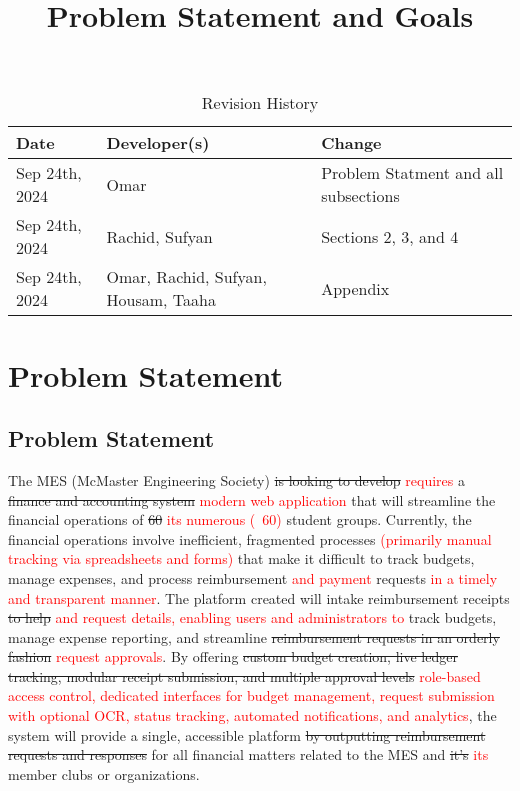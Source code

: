 \documentclass{article}
\title{Problem Statement and Goals\\\progname}
\author{\authname}
\date{}
\begin{document}
\maketitle

\begin{table}[hp]
\caption{Revision History} \label{TblRevisionHistory}
\begin{tabularx}{\textwidth}{llX}
\toprule
\textbf{Date} & \textbf{Developer(s)} & \textbf{Change}\\
\midrule
Sep 24th, 2024 & Omar & Problem Statment and all subsections \\
Sep 24th, 2024 & Rachid, Sufyan & Sections 2, 3, and 4 \\
Sep 24th, 2024 & Omar, Rachid, Sufyan, Housam, Taaha & Appendix \\
\bottomrule
\end{tabularx}
\end{table}

\section{Problem Statement}

\subsection{Problem Statement}

\hspace{0.5cm} The MES (McMaster Engineering Society) \sout{is looking to develop} \textcolor{red}{requires} a \sout{finance and accounting system} \textcolor{red}{modern web application} that will streamline the financial operations of \sout{60} \textcolor{red}{its numerous (~60)} student groups. Currently, the financial operations involve inefficient, fragmented processes \textcolor{red}{(primarily manual tracking via spreadsheets and forms)} that make it difficult to track budgets, manage expenses, and process reimbursement \textcolor{red}{and payment} requests \textcolor{red}{in a timely and transparent manner}. The platform created will intake reimbursement receipts \sout{to help} \textcolor{red}{and request details, enabling users and administrators to} track budgets, manage expense reporting, and streamline \sout{reimbursement requests in an orderly fashion} \textcolor{red}{request approvals}. By offering \sout{custom budget creation, live ledger tracking, modular receipt submission, and multiple approval levels} \textcolor{red}{role-based access control, dedicated interfaces for budget management, request submission with optional OCR, status tracking, automated notifications, and analytics}, the system will provide a single, accessible platform \sout{by outputting reimbursement requests and responses} for all financial matters related to the MES and \sout{it's} \textcolor{red}{its} member clubs or organizations.
\end{document}

